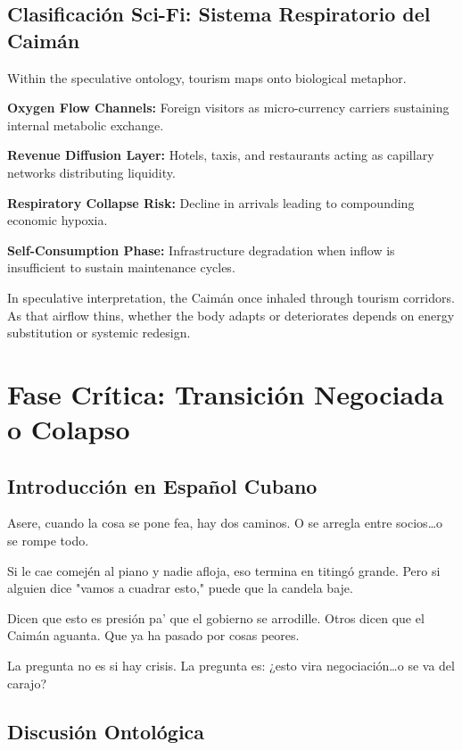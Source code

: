 \documentclass[12pt]{article}
\begin{document}
\subsection*{Clasificación Sci-Fi: Sistema Respiratorio del Caimán}

Within the speculative ontology, tourism maps onto biological metaphor.

\textbf{Oxygen Flow Channels:} Foreign visitors as micro-currency carriers sustaining internal metabolic exchange.

\textbf{Revenue Diffusion Layer:} Hotels, taxis, and restaurants acting as capillary networks distributing liquidity.

\textbf{Respiratory Collapse Risk:} Decline in arrivals leading to compounding economic hypoxia.

\textbf{Self-Consumption Phase:} Infrastructure degradation when inflow is insufficient to sustain maintenance cycles.

In speculative interpretation, the Caimán once inhaled through tourism corridors. As that airflow thins, whether the body adapts or deteriorates depends on energy substitution or systemic redesign.

\section{Fase Crítica: Transición Negociada o Colapso}

\subsection*{Introducción en Español Cubano}

Asere, cuando la cosa se pone fea, hay dos caminos. O se arregla entre socios\ldots o se rompe todo.

Si le cae comején al piano y nadie afloja, eso termina en titingó grande. Pero si alguien dice "vamos a cuadrar esto," puede que la candela baje.

Dicen que esto es presión pa' que el gobierno se arrodille. Otros dicen que el Caimán aguanta. Que ya ha pasado por cosas peores.

La pregunta no es si hay crisis. La pregunta es: ¿esto vira negociación\ldots o se va del carajo?

\subsection*{Discusión Ontológica}
\end{document}
